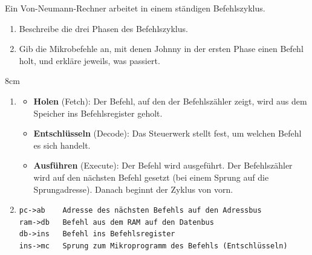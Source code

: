 \question[4]
Ein Von-Neumann-Rechner arbeitet in einem ständigen Befehlszyklus.
\begin{enumerate}[label=\alph*)]
\item Beschreibe die drei Phasen des Befehlszyklus.
\item Gib die Mikrobefehle an, mit denen Johnny in der ersten Phase einen Befehl holt,
und erkläre jeweils, was passiert.
\end{enumerate}

\begin{solutionbox}{8cm}
\begin{enumerate}[label=\alph*)]
\item
\begin{itemize}
\item \textbf{Holen} (Fetch): Der Befehl, auf den der Befehlszähler zeigt, wird aus dem Speicher
ins Befehlsregister geholt.
\item \textbf{Entschlüsseln} (Decode): Das Steuerwerk stellt fest, um welchen Befehl es sich handelt.
\item \textbf{Ausführen} (Execute): Der Befehl wird ausgeführt. Der Befehlszähler wird auf den
nächsten Befehl gesetzt (bei einem Sprung auf die Sprungadresse). Danach beginnt der Zyklus von vorn.
\end{itemize}
\item
\begin{verbatim}
pc->ab    Adresse des nächsten Befehls auf den Adressbus
ram->db   Befehl aus dem RAM auf den Datenbus
db->ins   Befehl ins Befehlsregister
ins->mc   Sprung zum Mikroprogramm des Befehls (Entschlüsseln)
\end{verbatim}
\end{enumerate}
\end{solutionbox}
